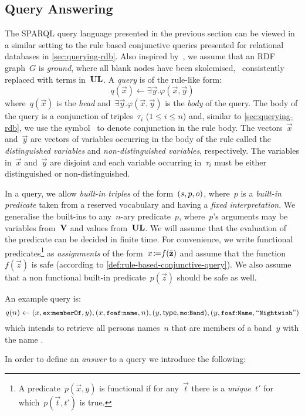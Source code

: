 
\subsection*{Query Answering}
\label{sec:query-answering}

The SPARQL query language presented in the previous section can be viewed in a similar setting to the rule based
conjunctive queries presented for relational databases in \cref{sec:querying-rdb}.
%
Also inspired by~\citet{GutierrezHurtadoMendelzon:2004aa}, we assume that an RDF graph~$G$ is \emph{ground}, where all
blank nodes have been skolemised, \ie~consistently replaced with terms in~$\mathbf{UL}$.
%
A \emph{query} is of the rule-like form:
%
$$q(\vec{x}) \leftarrow \exists \vec{y}.\varphi(\vec{x},\vec{y})$$
%
where~$q(\vec{x})$ is the \emph{head} and~$\exists \vec{y}.\varphi(\vec{x},\vec{y})$ is the \emph{body} of the query.
%
The body of the query is a conjunction of triples~$\tau_{i}$ ($1 \leq i \leq n$) and, similar to
\cref{sec:querying-rdb}, we use the symbol~\character{$,$} to denote conjunction in the rule body.
%
The vectors~$\vec{x}$ and~$\vec{y}$ are vectors of variables occurring in the body of the rule called the
\emph{distinguished variables} and \emph{non-distinguished variables}, respectively.  The variables in~$\vec{x}$ and~$\vec{y}$ are
disjoint and each variable occurring in~$\tau_{i}$ must be either distinguished or non-distinguished.
%

In a query, we allow \emph{built-in triples} of the form~$(s,p,o)$, where~$p$ is a \emph{built-in predicate}
taken from a reserved vocabulary and having a \emph{fixed interpretation}. 
%
We generalise the built-ins to any~$n$-ary predicate~$p$, where~$p$'s arguments may be variables from~$\mathbf{V}$
%
and values from~$\mathbf{UL}$.  We will assume that the evaluation of the predicate can be decided in finite time.
%
For convenience, we write functional predicates\footnote{A predicate~$p(\vec{x},y)$ is functional if for any~$\vec{t}$
  there is a \emph{unique}~$t'$ for which~$p(\vec{t},t')$ is true.} as \emph{assignments} of the form~$x\mbox{$\colon\!\!\!\!=$}
f(\bar{\mathbf z})$ and assume that the function~$f(\vec{z})$ is safe (according to
\cref{def:rule-based-conjunctive-query}). We also assume that a non functional built-in predicate~$p(\vec{z})$ should
be safe as well.

\begin{example}
  An example query is:
  \[q(n) \leftarrow (x, \mbox{\small$\mathtt{ex{:}memberOf}$}, y), (x, \mbox{\small$\mathtt{foaf{:}name}$}, n), (y, \mathsf{type},
    \mbox{\small$\mathtt{mo{:}Band}$}), (y, \mbox{\small$\mathtt{foaf{:}Name}$}, \textrm{``}{\texttt{\ensuremath{\mbox{\small$\mathtt{Nightwish}$}}}}\textrm{''})\] \nd which intends to retrieve
  all persons names~$n$ that are members of a band~$y$ with the name .
\end{example}
In order to define an \emph{answer} to a query we introduce the following:

